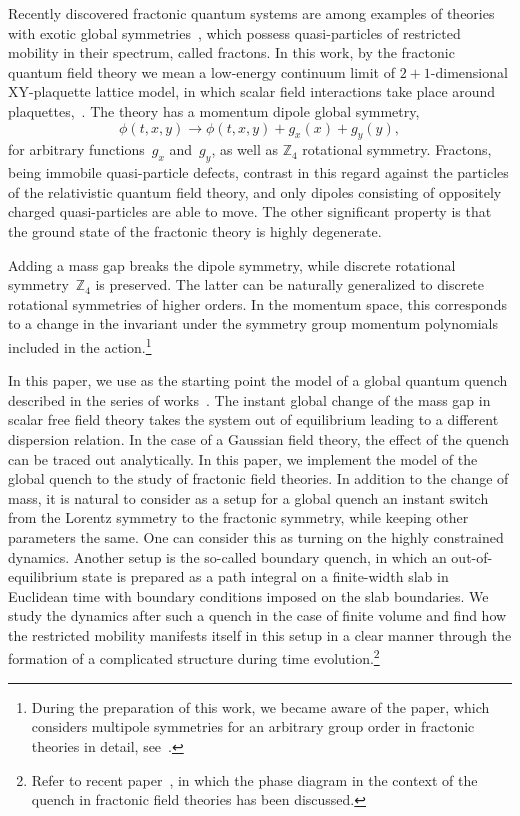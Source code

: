 \documentclass[a4paper,12pt]{article}
\newcommand{\be}{\begin{equation}}
\newcommand{\ee}{\end{equation}}
\newcommand{\nn}{\nonumber}
\newcommand{\Z}[1]{\mathbb{Z}_{#1}}
\begin{document}
Recently discovered fractonic quantum systems are among examples of theories with exotic global symmetries~\cite{Vijay:2015mka, Pretko:2018jbi, Gromov2019towards, Radzihovsky:2019jdo, Seiberg:2019vrp, Seiberg:2020bhn, Distler:2021bop, Bulmash:2023msp}, 
which possess quasi-particles of restricted mobility in their spectrum, called fractons. In this work, by the fractonic quantum field theory we mean a low-energy continuum limit of $2 + 1$-dimensional XY-plaquette lattice model, in which scalar field interactions take place around plaquettes,~\cite{Paramekanti2002ring, Seiberg:2020bhn}. The theory has a momentum dipole global symmetry,
\be\nn
    \phi(t, x, y) \to \phi(t, x, y) + g_x(x) + g_y(y),
\ee
for arbitrary functions~$g_x$ and~$g_y$, as well as $\Z4$ rotational symmetry. Fractons, being immobile quasi-particle defects, contrast in this regard against the particles of the relativistic quantum field theory, and only dipoles consisting of oppositely charged quasi-particles are able to move. The other significant property is that the ground state of the fractonic theory is highly degenerate.

Adding a mass gap breaks the dipole symmetry, while discrete rotational symmetry~$\Z4$ is preserved. The latter can be naturally generalized to discrete rotational symmetries of higher orders. In the momentum space, this corresponds to a change in the invariant under the symmetry group momentum polynomials included in the action.\footnote{During the preparation of this work, we became aware of the paper, which considers multipole symmetries for an arbitrary group order in fractonic theories in detail, see~\cite{Bulmash:2023msp}.}

In this paper, we use as the starting point the model of a global quantum quench described in the series of works~\cite{Calabrese:2007rg, Sotiriadis2009thermal, Sotiriadis:2010si}. The instant global change of the mass gap in scalar free field theory takes the system out of equilibrium leading to a different dispersion relation. In the case of a Gaussian field theory, the effect of the quench can be traced out analytically. In this paper, we implement the model of the global quench to the study of fractonic field theories. In addition to the change of mass, it is natural to consider as a setup for a global quench an instant switch from the Lorentz symmetry to the fractonic symmetry, while keeping other parameters the same. One can consider this as turning on the highly constrained dynamics. Another setup is the so-called boundary quench, in which an out-of-equilibrium state is prepared as a path integral on a finite-width slab in Euclidean time with boundary conditions imposed on the slab boundaries. We study the dynamics after such a quench in the case of finite volume and find how the restricted mobility manifests itself in this setup in a clear manner through the formation of a complicated structure during time evolution.\footnote{Refer to recent paper~\cite{Islam:2023cmm}, in which the phase diagram in the context of the quench in fractonic field theories has been discussed.}
\end{document}
